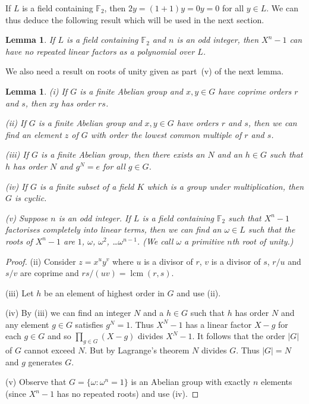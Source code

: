 \documentclass[12pt,a4paper]{article}
\theoremstyle{plain}
\newtheorem{lemma}[theorem]{Lemma}
\theoremstyle{definition}
\newcommand{\lcm}{\operatorname{lcm}}
\begin{document}
    If $L$ is a field containing ${\mathbb F}_{2}$, then
    $2y=(1+1)y=0y=0$ for all $y\in L$. We can thus
    deduce the following result which will be used
    in the next section.
    \begin{lemma}
        \label{no repeat}
        If $L$ is a field containing ${\mathbb F}_{2}$
        and $n$ is an odd integer, then
        $X^{n}-1$ can have no repeated linear factors
        as a polynomial over $L$.
    \end{lemma}

    We also need a result on roots of unity
    given as part~(v) of the next lemma.
    \begin{lemma}
        \label{primitive} (i) If $G$
        is a finite Abelian
        group and $x,y\in G$ have coprime orders
        $r$ and $s$, then $xy$ has order $rs$.

        (ii) If $G$ is a finite Abelian
        group and $x,y\in G$ have orders
        $r$ and $s$, then we can find an element
        $z$ of $G$ with order the lowest common multiple
        of $r$ and $s$.

        (iii) If $G$ is a finite Abelian
        group, then there exists an $N$ and
        an $h\in G$ such that $h$ has order $N$
        and $g^{N}=e$ for all $g\in G$.

        (iv) If $G$ is a finite subset of a field $K$
        which is a group under multiplication, then
        $G$ is cyclic.

        (v) Suppose $n$ is an odd integer.
        If $L$ is a field containing ${\mathbb F}_{2}$
        such that $X^{n}-1$ factorises completely
        into linear terms, then we can find
        an $\omega\in L$ such that the roots
        of $X^{n}-1$ are $1$, $\omega$, $\omega^{2}$,
        \dots $\omega^{n-1}$. (We call $\omega$ a
        \emph{primitive} $n$th root of unity.)
    \end{lemma}
    \begin{proof}
        (ii) Consider $z=x^{u}y^{v}$
        where $u$ is a divisor of $r$, $v$ is a divisor
        of $s$, $r/u$ and $s/v$ are coprime and
        $rs/(uv)=\lcm(r,s)$.

        (iii) Let $h$ be an element of highest order
        in $G$ and use (ii).

        (iv) By (iii) we can find an integer
        $N$ and a $h\in G$ such that $h$
        has order $N$ and any element $g\in G$
        satisfies $g^{N}=1$. Thus $X^{N}-1$
        has a linear factor $X-g$ for each $g\in G$
        and so $\prod_{g\in G}(X-g)$ divides $X^{N}-1$.
        It follows that the order $|G|$ of $G$ cannot
        exceed $N$. But by Lagrange's theorem $N$ divides $G$.
        Thus $|G|=N$ and $g$ generates $G$.

        (v) Observe that $G=\{\omega:\omega^{n}=1\}$ is
        an Abelian group with exactly $n$ elements
        (since $X^{n}-1$ has no repeated roots) and
        use (iv).
    \end{proof}
\end{document}

